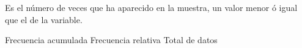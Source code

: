 
\question Es el número de veces que ha aparecido en la muestra, un valor
menor ó igual que el de la variable.

  \begin{oneparchoices}
    \CorrectChoice Frecuencia acumulada
    \choice Frecuencia relativa
    \choice Total de datos
  \end{oneparchoices}
